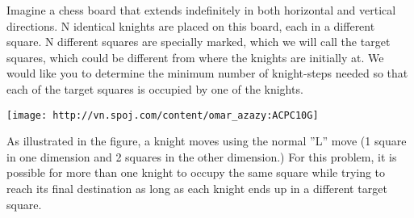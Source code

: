 Imagine a chess board that extends indefinitely in both horizontal and vertical directions. N identical knights are placed on this board, each in a different square. N different squares are specially marked, which we will call the target squares, which could be different from where the knights are initially at. We would like you to determine the minimum number of knight-steps needed so that each of the target squares is occupied by one of the knights.


\texttt{[image: http://vn.spoj.com/content/omar\_azazy:ACPC10G]}

As illustrated in the figure, a knight moves using the normal ”L” move (1 square in one dimension and 2 squares in the other dimension.) For this problem, it is possible for more than one knight to occupy the same square while trying to reach its final destination as long as each knight ends up in a different target square.

\